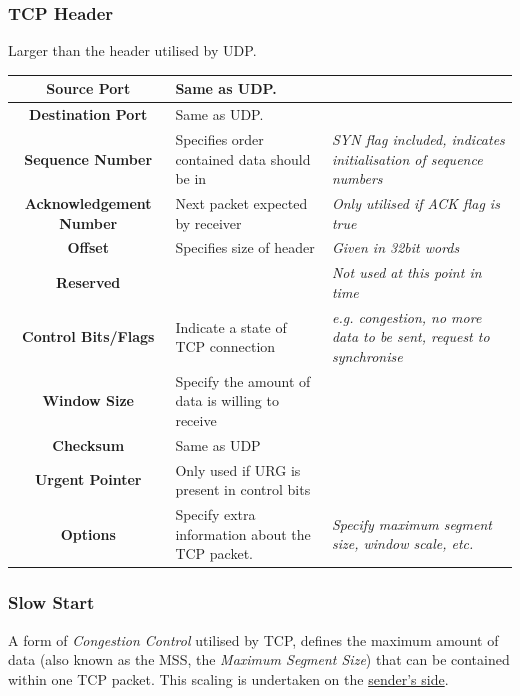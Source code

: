 \documentclass{article}
\begin{document}
\subsubsection{TCP Header}

Larger than the header utilised by UDP.
\begin{center}
  \begin{tabular}{|c|p{4cm}|p{3.5cm}|}
    \hline
    \textbf{Source Port} & Same as UDP. & \\
    \hline
    \textbf{Destination Port} & Same as UDP. & \\
    \hline
    \textbf{Sequence Number} & Specifies order contained data should be in & \textit{SYN flag included, indicates initialisation of sequence numbers}\\
    \hline
    \textbf{Acknowledgement Number} & Next packet expected by receiver & \textit{Only utilised if ACK flag is true}\\
    \hline
    \textbf{Offset} & Specifies size of header & \textit{Given in 32bit words}\\
    \hline
    \textbf{Reserved} & & \textit{Not used at this point in time}\\
    \hline
    \textbf{Control Bits/Flags} & Indicate a state of TCP connection & \textit{e.g. congestion, no more data to be sent, request to synchronise}\\
    \hline
    \textbf{Window Size} & Specify the amount of data is willing to receive & \\
    \hline
    \textbf{Checksum} & Same as UDP & \\
    \hline
    \textbf{Urgent Pointer} & Only used if URG is present in control bits & \\
    \hline
    \textbf{Options} & Specify extra information about the TCP packet. & \textit{Specify maximum segment size, window scale, etc.}\\
    \hline
  \end{tabular}
\end{center}
\filbreak
\subsubsection{Slow Start}

A form of \textit{Congestion Control} utilised by TCP, defines the maximum amount of data (also known as the MSS, the \textit{Maximum Segment Size}) that can be contained within one TCP packet. This scaling is undertaken on the \underline{sender's side}.
\end{document}
